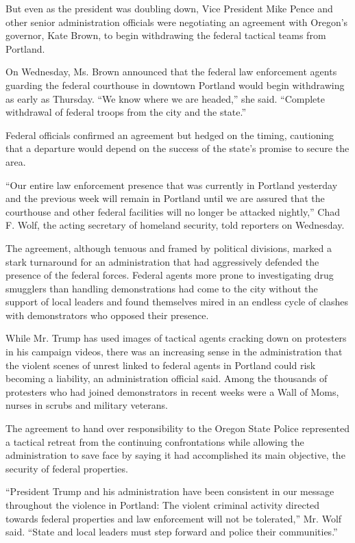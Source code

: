 But even as the president was doubling down, Vice President Mike Pence
and other senior administration officials were negotiating an agreement
with Oregon's governor, Kate Brown, to begin withdrawing the federal
tactical teams from Portland.

On Wednesday, Ms. Brown announced that the federal law enforcement
agents guarding the federal courthouse in downtown Portland would begin
withdrawing as early as Thursday. ``We know where we are headed,'' she
said. ``Complete withdrawal of federal troops from the city and the
state.''

Federal officials confirmed an agreement but hedged on the timing,
cautioning that a departure would depend on the success of the state's
promise to secure the area.

``Our entire law enforcement presence that was currently in Portland
yesterday and the previous week will remain in Portland until we are
assured that the courthouse and other federal facilities will no longer
be attacked nightly,'' Chad F. Wolf, the acting secretary of homeland
security, told reporters on Wednesday.

The agreement, although tenuous and framed by political divisions,
marked a stark turnaround for an administration that had aggressively
defended the presence of the federal forces. Federal agents more prone
to investigating drug smugglers than handling demonstrations had come to
the city without the support of local leaders and found themselves mired
in an endless cycle of clashes with demonstrators who opposed their
presence.

While Mr. Trump has used images of tactical agents cracking down on
protesters in his campaign videos, there was an increasing sense in the
administration that the violent scenes of unrest linked to federal
agents in Portland could risk becoming a liability, an administration
official said. Among the thousands of protesters who had joined
demonstrators in recent weeks were a Wall of Moms, nurses in scrubs and
military veterans.

The agreement to hand over responsibility to the Oregon State Police
represented a tactical retreat from the continuing confrontations while
allowing the administration to save face by saying it had accomplished
its main objective, the security of federal properties.

``President Trump and his administration have been consistent in our
message throughout the violence in Portland: The violent criminal
activity directed towards federal properties and law enforcement will
not be tolerated,'' Mr. Wolf said. ``State and local leaders must step
forward and police their communities.''

